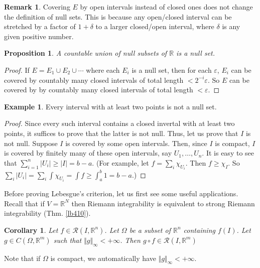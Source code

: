 \documentclass[12pt,b5paper,notitlepage]{article}
\theoremstyle{definition}
\newtheorem{eg}[df]{Example}
\newtheorem{rem}[df]{Remark}
\theoremstyle{plain}
\newtheorem{pp}[df]{Proposition}
\newtheorem{co}[df]{Corollary}
\newcommand{\scr}{\mathscr}
\newcommand{\Rbb}{\mathbb R}
\newcommand{\eps}{\varepsilon}
\numberwithin{equation}{section}
\begin{document}
\begin{rem}
Covering $E$ by open intervals instead of closed ones does not change the definition of null sets. This is because any open/closed interval can be stretched by a factor of $1+\delta$ to a larger closed/open interval, where $\delta$ is any given positive number.
\end{rem}


\begin{pp}\label{lb412}
A countable union of null subsets of $\Rbb$ is a null set.
\end{pp}

\begin{proof}
If $E=E_1\cup E_2\cup\cdots$ where each $E_i$ is a null set, then for each $\eps$, $E_i$ can be covered by countably many closed intervals of total length $<2^{-i}\eps$. So $E$ can be covered by by countably many closed intervals of total length $<\eps$.
\end{proof}


\begin{eg}
Every interval with at least two points is not a null set.
\end{eg}

\begin{proof}
Since every such interval contains a closed invertal with at least two points, it suffices to prove that the latter is not null. Thus, let us prove that $I$ is not null. Suppose $I$ is covered by some open intervals. Then, since $I$ is compact, $I$ is covered by finitely many of these open intervals, say $U_1,\dots,U_n$. It is easy to see that  $\sum_{i=1}^n |U_i|\geq|I|= b-a$. (For example, let $f=\sum_i \chi_{U_i}$. Then $f\geq \chi_I$. So $\sum_i |U_i|=\sum_i\int\chi_{U_i}=\int f\geq\int_a^b 1=b-a$.)
\end{proof}



Before proving Lebesgue's criterion, let us first see some useful applications. Recall that if $V=\Rbb^N$ then Riemann integrability is equivalent to strong Riemann integrability (Thm. \ref{lb410}).

\begin{co}
Let $f\in\scr R(I,\Rbb^n)$. Let $\Omega$ be a subset of $\Rbb^n$ containing $f(I)$. Let $g\in C(\Omega,\Rbb^m)$ such that $\Vert g\Vert_\infty<+\infty$. Then $g\circ f\in\scr R(I,\Rbb^m)$
\end{co}

Note that if $\Omega$ is compact, we automatically have $\Vert g\Vert_\infty<+\infty$.
\end{document}
